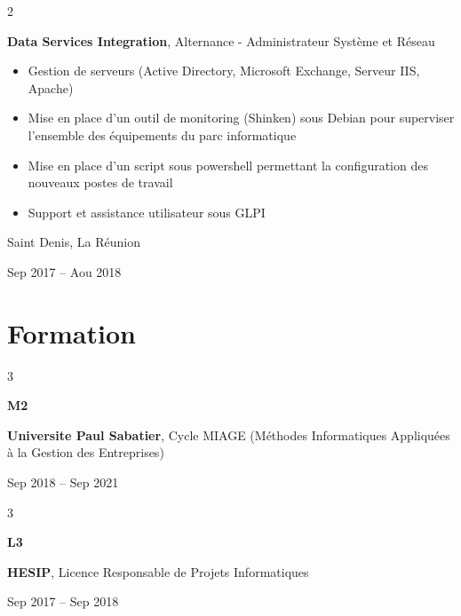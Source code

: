 \documentclass[10pt, letterpaper]{article}
\newenvironment{highlights}{
    \begin{itemize}[
        topsep=0.10 cm,
        parsep=0.10 cm,
        partopsep=0pt,
        itemsep=0pt,
        leftmargin=0.4 cm + 10pt
    ]
}{
    \end{itemize}
} %
\newenvironment{twocolentry}[2][]{
    \onecolentry
    \def\secondColumn{#2}
    \setcolumnwidth{\fill, 4.5 cm}
    \begin{paracol}{2}
}{
    \switchcolumn \raggedleft \secondColumn
    \end{paracol}
    \endonecolentry
} %
\newenvironment{threecolentry}[3][]{
    \onecolentry
    \def\thirdColumn{#3}
    \setcolumnwidth{1 cm, \fill, 4.5 cm}
    \begin{paracol}{3}
    {\raggedright #2} \switchcolumn
}{
    \switchcolumn \raggedleft \thirdColumn
    \end{paracol}
    \endonecolentry
} %
\begin{document}
    

\begin{twocolentry}{
    Saint Denis, La Réunion
    
    Sep 2017 – Aou 2018
}
\textbf{Data Services Integration}, Alternance - Administrateur Système et Réseau
\begin{highlights}
    \item Gestion de serveurs (Active Directory, Microsoft Exchange, Serveur IIS, Apache)
    \item Mise en place d'un outil de monitoring (Shinken) sous Debian pour superviser l'ensemble des équipements du parc informatique
    \item Mise en place d'un script sous powershell permettant la configuration des nouveaux postes de travail
    \item Support et assistance utilisateur sous GLPI
\end{highlights}
\end{twocolentry}


\section{Formation}


\begin{threecolentry}{\textbf{M2}}{
		Sep 2018 – Sep 2021
	}
	\textbf{Universite Paul Sabatier}, Cycle MIAGE (Méthodes Informatiques Appliquées à la Gestion des Entreprises)
\end{threecolentry}


\begin{threecolentry}{\textbf{L3}}{
    Sep 2017 – Sep 2018
}
\textbf{HESIP}, Licence Responsable de Projets Informatiques
\end{threecolentry}
    
\end{document}
